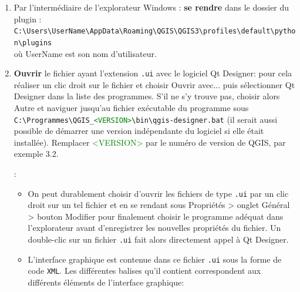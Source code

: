 \documentclass[11pt]{article}
\begin{document}
\begin{enumerate}\itemsep0.4em
\item Par l'intermédiaire de l'explorateur Windows : \textbf{se rendre} dans le dossier du plugin :\\
\texttt{C:\textbackslash{}Users\textbackslash{}\textcolor{mygreen}{UserName}\textbackslash{}AppData\textbackslash{}Roaming\textbackslash{}QGIS\textbackslash{}QGIS3\textbackslash{}profiles\textbackslash{}default\textbackslash{}python\textbackslash{}plugins}\\
où \textcolor{mygreen}{UserName} est son nom d'utilisateur.


\item \textbf{Ouvrir} le fichier ayant l'extension \og{}\texttt{.ui}\fg{} avec le logiciel \og{}Qt Designer\fg{}: pour cela réaliser un clic droit sur le fichier et choisir \og{}Ouvrir avec...\fg{} puis sélectionner \og{}Qt Designer\fg{} dans la liste des programmes. S'il ne s'y trouve pas, choisir alors \og{}Autre\fg{} et naviguer jusqu'au fichier exécutable du programme sous \texttt{C:\textbackslash{}Programmes\textbackslash{}QGIS\_\textcolor{green}{<VERSION>}\textbackslash{}bin\textbackslash{}qgis-designer.bat} (il serait aussi possible de démarrer une version indépendante du logiciel si elle était installée). Remplacer \textcolor{green}{<VERSION>} par le numéro de version de QGIS, par exemple 3.2.

\underline{}: \vspace*{0.4em}
\begin{itemize}\itemsep0.4em
\renewcommand\labelitemi{\---}
\item On peut durablement choisir d'ouvrir les fichiers de type \og{}\texttt{.ui}\fg{} par un clic droit sur un tel fichier et en se rendant sous \og{}Propriétés\fg{} > onglet \og{}Général\fg{} > bouton \og{}Modifier\fg{} pour finalement choisir le programme adéquat dans l'explorateur avant d'enregistrer les nouvelles propriétés du fichier. Un double-clic sur un fichier \og{}\texttt{.ui}\fg{} fait alors directement appel à \og{}Qt Designer\fg{}.


\item L'interface graphique est contenue dans ce fichier \og{}\texttt{.ui}\fg{} sous la forme de code \texttt{XML}. Les différentes balises qu'il contient correspondent aux différents éléments de l'interface graphique:


\end{itemize}
\end{enumerate}
\end{document}
